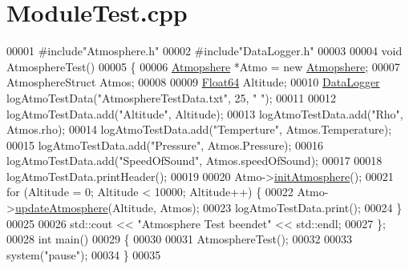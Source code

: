 \hypertarget{_module_test_8cpp_source}{}\section{Module\+Test.\+cpp}
\label{_module_test_8cpp_source}

\begin{DoxyCode}
00001 \textcolor{preprocessor}{#include"Atmosphere.h"}
00002 \textcolor{preprocessor}{#include"DataLogger.h"}
00003 
00004 \textcolor{keywordtype}{void} AtmosphereTest()
00005 \{
00006     \hyperlink{group___atmosphere_class_atmopshere}{Atmopshere} *Atmo = \textcolor{keyword}{new} \hyperlink{group___atmosphere_class_atmopshere}{Atmopshere};
00007     AtmosphereStruct Atmos;
00008 
00009     \hyperlink{group___tools_ga3f1431cb9f76da10f59246d1d743dc2c}{Float64} Altitude;
00010     \hyperlink{group___tools_class_data_logger}{DataLogger} logAtmoTestData(\textcolor{stringliteral}{"AtmosphereTestData.txt"}, 25, \textcolor{stringliteral}{" "});
00011 
00012     logAtmoTestData.add(\textcolor{stringliteral}{"Altitude"}, Altitude);
00013     logAtmoTestData.add(\textcolor{stringliteral}{"Rho"}, Atmos.rho);
00014     logAtmoTestData.add(\textcolor{stringliteral}{"Temperture"}, Atmos.Temperature);
00015     logAtmoTestData.add(\textcolor{stringliteral}{"Pressure"}, Atmos.Pressure);
00016     logAtmoTestData.add(\textcolor{stringliteral}{"SpeedOfSound"}, Atmos.speedOfSound);
00017 
00018     logAtmoTestData.printHeader();
00019 
00020     Atmo->\hyperlink{group___atmosphere_a6e1d5763fbb6631784c99ee3c88911bd}{initAtmosphere}();
00021     \textcolor{keywordflow}{for} (Altitude = 0; Altitude < 10000; Altitude++) \{
00022         Atmo->\hyperlink{group___atmosphere_a2bd97471d32725d6196ee6816ea36c99}{updateAtmosphere}(Altitude, Atmos);
00023         logAtmoTestData.print();
00024     \}
00025 
00026     std::cout << \textcolor{stringliteral}{"Atmosphere Test beendet"} << std::endl;
00027 \};
00028 \textcolor{keywordtype}{int} main()
00029 \{
00030     
00031     AtmosphereTest();
00032 
00033     system(\textcolor{stringliteral}{"pause"});
00034 \}
00035 
\end{DoxyCode}
